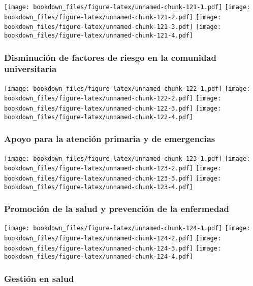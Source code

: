 \documentclass[]{article}
\theoremstyle{definition}
\theoremstyle{definition}
\theoremstyle{definition}
\theoremstyle{remark}
\begin{document}
\texttt{[image: bookdown\_files/figure-latex/unnamed-chunk-121-1.pdf]}
\texttt{[image: bookdown\_files/figure-latex/unnamed-chunk-121-2.pdf]}
\texttt{[image: bookdown\_files/figure-latex/unnamed-chunk-121-3.pdf]}
\texttt{[image: bookdown\_files/figure-latex/unnamed-chunk-121-4.pdf]}

\subsubsection{Disminución de factores de riesgo en la comunidad
universitaria}\label{disminucion-de-factores-de-riesgo-en-la-comunidad-universitaria}

\texttt{[image: bookdown\_files/figure-latex/unnamed-chunk-122-1.pdf]}
\texttt{[image: bookdown\_files/figure-latex/unnamed-chunk-122-2.pdf]}
\texttt{[image: bookdown\_files/figure-latex/unnamed-chunk-122-3.pdf]}
\texttt{[image: bookdown\_files/figure-latex/unnamed-chunk-122-4.pdf]}

\subsubsection{Apoyo para la atención primaria y de
emergencias}\label{apoyo-para-la-atencion-primaria-y-de-emergencias}

\texttt{[image: bookdown\_files/figure-latex/unnamed-chunk-123-1.pdf]}
\texttt{[image: bookdown\_files/figure-latex/unnamed-chunk-123-2.pdf]}
\texttt{[image: bookdown\_files/figure-latex/unnamed-chunk-123-3.pdf]}
\texttt{[image: bookdown\_files/figure-latex/unnamed-chunk-123-4.pdf]}

\subsubsection{Promoción de la salud y prevención de la
enfermedad}\label{promocion-de-la-salud-y-prevencion-de-la-enfermedad}

\texttt{[image: bookdown\_files/figure-latex/unnamed-chunk-124-1.pdf]}
\texttt{[image: bookdown\_files/figure-latex/unnamed-chunk-124-2.pdf]}
\texttt{[image: bookdown\_files/figure-latex/unnamed-chunk-124-3.pdf]}
\texttt{[image: bookdown\_files/figure-latex/unnamed-chunk-124-4.pdf]}

\subsubsection{Gestión en salud}\label{gestion-en-salud}
\end{document}
